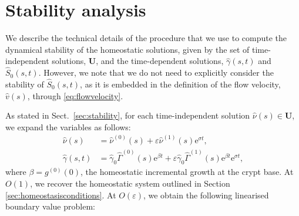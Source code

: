 \section{Stability analysis}
\label{app:stabilityanalysis}
We describe the technical details of the procedure that we use to compute the dynamical stability of the homeostatic solutions, given by the set of time-independent solutions, $\mathbf{U}$, and the time-dependent solutions, $\hat{\gamma}(s, t)$ and $\hat{S}_0(s, t)$. However, we note that we do not need to explicitly consider the stability of $\hat{S}_0(s, t)$, as it is embedded in the definition of the flow velocity, $\hat{v}(s)$, through \eqref{eq:flowvelocity}. 

As stated in Sect.\ \ref{sec:stability}, for each time-independent solution $\hat{\nu}(s) \in \mathbf{U}$, we expand the variables as follows:
\begin{align}
\hat{\nu}(s) &= \hat{\nu}^{(0)}(s) + \varepsilon\hat{\nu}^{(1)}(s)\mathrm{e}^{\sigma t},\label{eq:timeindeptsolnpertapp}\\
\hat{\gamma}(s,t) &= \hat{\gamma}_0\hat{\Gamma}^{(0)}(s)\mathrm{e}^{\beta t} + \varepsilon\hat{\gamma}_0\hat{\Gamma}^{(1)}(s)\mathrm{e}^{\beta t}\mathrm{e}^{\sigma t},
\end{align}
where $\beta = g^{(0)}(0)$, the homeostatic incremental growth at the crypt base. At $O(1)$, we recover the homeostatic system outlined in Section \ref{sec:homeostasisconditions}. At $O(\varepsilon)$, we obtain the following linearised boundary value problem:
